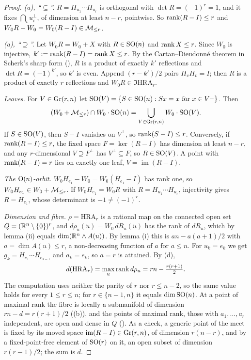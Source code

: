 \begin{proof}
\emph{(a), ``$\subseteq$''.} $R=H_{u_1}\cdots H_{u_r}$ is orthogonal with $\det R=(-1)^r=1$, and it fixes
$\bigcap_iu_i^\perp$, of dimension at least $n-r$, pointwise. So $\operatorname{rank}(R-I)\le r$ and $W_0R-W_0=W_0(R-I)\in\mathcal{M}_{\le r}$.

\emph{(a), ``$\supseteq$''.} Let $W_0R=W_0+X$ with $R\in\mathrm{SO}(n)$ and $\operatorname{rank} X\le r$. Since $W_0$ is injective,
$k':=\operatorname{rank}(R-I)=\operatorname{rank} X\le r$. By the Cartan--Dieudonn\'e theorem in Scherk's sharp form (), $R$ is a product of
exactly $k'$ reflections and $\det R=(-1)^{k'}$, so $k'$ is even. Append $(r-k')/2$ pairs $H_vH_v=I$; then $R$ is a product
of exactly $r$ reflections and $W_0R\in\Im\mathrm{HRA}_r$.

\emph{Leaves.} For $V\in\operatorname{Gr}(r,n)$ let $\mathrm{SO}(V)=\{S\in\mathrm{SO}(n):Sx=x\text{ for }x\in V^\perp\}$. Then
\begin{equation*}
  (W_0+\mathcal{M}_{\le r})\cap W_0\cdot\mathrm{SO}(n)=\bigcup_{V\in\operatorname{Gr}(r,n)}W_0\cdot\mathrm{SO}(V).
\end{equation*}
If $S\in\mathrm{SO}(V)$, then $S-I$ vanishes on $V^\perp$, so $\operatorname{rank}(S-I)\le r$. Conversely, if $\operatorname{rank}(R-I)\le r$, the fixed space
$F=\ker(R-I)$ has dimension at least $n-r$, and any $r$-dimensional $V\supseteq F^\perp$ has $V^\perp\subseteq F$, so
$R\in\mathrm{SO}(V)$. A point with $\operatorname{rank}(R-I)=r$ lies on exactly one leaf, $V=\operatorname{im}(R-I)$.

\emph{The $\mathrm{O}(n)$-orbit.} $W_0H_{e_1}-W_0=W_0(H_{e_1}-I)$ has rank one, so $W_0H_{e_1}\in W_0+\mathcal{M}_{\le r}$. If
$W_0H_{e_1}=W_0R$ with $R=H_{u_1}\cdots H_{u_r}$, injectivity gives $R=H_{e_1}$, whose determinant is $-1\ne(-1)^r$.

\emph{Dimension and fibre.} $\rho=\mathrm{HRA}_r$ is a rational map on the connected open set
$Q=(\mathbb{R}^n\setminus\{0\})^r$, and $d\rho_u(\dot u)=W_0\,dR_u(\dot u)$ has the rank of $dR_u$, which by lemma (ii) equals
$\dim(\mathbb{R}^n\wedge A(u))$. By lemma (i) this is $an-a(a+1)/2$ with $a=\dim A(u)\le r$, a non-decreasing function of $a$ for
$a\le n$. For $u_k=e_k$ we get $g_k=H_{e_1}\cdots H_{e_{k-1}}$ and $a_k=e_k$, so $a=r$ is attained. By (d),
\begin{equation*}
  d(\mathrm{HRA}_r)=\max_u\operatorname{rank} d\rho_u=rn-\tfrac{r(r+1)}2 .
\end{equation*}
The computation uses neither the parity of $r$ nor $r\le n-2$, so the same value holds for every $1\le r\le n$; for
$r\in\{n-1,n\}$ it equals $\dim\mathrm{SO}(n)$. At a point of maximal rank the fibre is locally a submanifold of dimension
$rn-d=r(r+1)/2$ ((b)), and the points of maximal rank, those with $a_1,\dots,a_r$ independent, are open and
dense in $Q$ (). As a check, a generic point of the meet is fixed by its moved space
$\operatorname{im}(R-I)\in\operatorname{Gr}(r,n)$, of dimension $r(n-r)$, and by a fixed-point-free element of $\mathrm{SO}(r)$ on it, an open
subset of dimension $r(r-1)/2$; the sum is $d$.


\end{proof}
